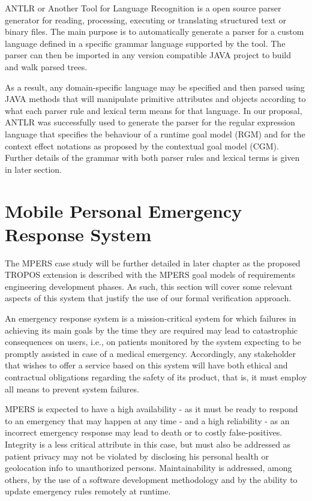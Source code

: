 ANTLR or Another Tool for Language Recognition is a open source parser generator for reading, processing, executing or translating structured text or binary files. The main purpose is to automatically generate a parser for a custom language defined in a specific grammar language supported by the tool. The parser can then be imported in any version compatible JAVA project to build and walk parsed trees. 

As a result, any domain-specific language may be specified and then parsed using JAVA methods that will manipulate primitive attributes and objects according to what each parser rule and lexical term means for that language. In our proposal, ANTLR was successfully used to generate the parser for the regular expression language that specifies the behaviour of a runtime goal model (RGM) and for the context effect notations as proposed by the contextual goal model (CGM). Further details of the grammar with both parser rules and lexical terms is given in later section.

\section{Mobile Personal Emergency Response System}

The MPERS case study will be further detailed in later chapter as the proposed TROPOS extension is described with the MPERS goal models of requirements engineering development phases. As such, this section will cover some relevant aspects of this system that justify the use of our formal verification approach.

An emergency response system is a mission-critical system for which failures in achieving its main goals by the time they are required may lead to catastrophic consequences on users, i.e., on patients monitored by the system expecting to be promptly assisted in case of a medical emergency. Accordingly, any stakeholder that wishes to offer a service based on this system will have both ethical and contractual obligations regarding the safety of its product, that is, it must employ all means to prevent system failures.

MPERS is expected to have a high availability - as it must be ready to respond to an emergency that may happen at any time - and a high reliability - as an incorrect emergency response may lead to death or to costly false-positives. Integrity is a less critical attribute in this case, but must also be addressed as patient privacy may not be violated by disclosing his personal health or geolocation info to unauthorized persons. Maintainability is addressed, among others, by the use of a software development methodology and by the ability to update emergency rules remotely at runtime.

